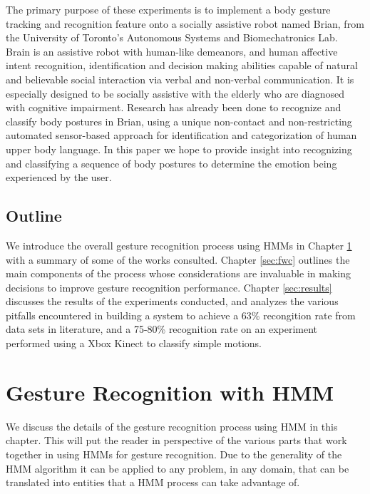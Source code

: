 \documentclass[]{report}   %
\begin{document}
The primary purpose of these experiments is to implement a body gesture tracking and recognition feature onto a socially assistive robot named Brian, from the University of Toronto's Autonomous Systems and Biomechatronics Lab. Brain is an assistive robot with human-like demeanors, and human affective intent recognition, identification and decision making abilities capable of natural and believable social interaction via verbal and non-verbal communication\cite{dmcoll}. It is especially designed to be socially assistive with the elderly who are diagnosed with cognitive impairment.
Research has already been done to recognize and classify body postures in Brian, using a unique non-contact and non-restricting automated sensor-based approach for identification and categorization of human upper body language\cite{dmcoll}. In this paper we hope to provide insight into recognizing and classifying a sequence of body postures to determine the emotion being experienced by the user.

\section*{Outline}
We introduce the overall gesture recognition process using HMMs in Chapter \ref{sec:overllprocess} with a summary of some of the works consulted. Chapter \ref{sec:fwc} outlines the main components of the process whose considerations are invaluable in making decisions to improve gesture recognition performance. Chapter \ref{sec:results} discusses the results of the experiments conducted, and analyzes the various pitfalls encountered in building a system to achieve a 63\% recongition rate from data sets in literature, and a 75-80\% recognition rate on an experiment performed using a Xbox Kinect to classify simple motions.

\chapter{Gesture Recognition with HMM}\label{sec:overllprocess}
We discuss the details of the gesture recognition process using HMM in this chapter. This will put the reader in perspective of the various parts that work together in using HMMs for gesture recognition. Due to the generality of the HMM algorithm it can be applied to any problem, in any domain, that can be translated into entities that a HMM process can take advantage of.
\end{document}
